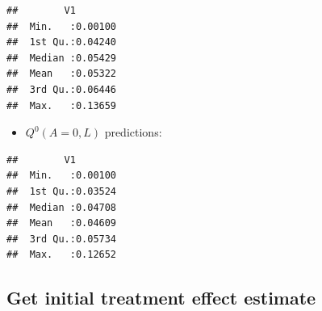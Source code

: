 \documentclass[
]{book}
\newenvironment{Shaded}{\begin{snugshade}}{\end{snugshade}}
\newcommand{\AttributeTok}[1]{\textcolor[rgb]{0.77,0.63,0.00}{#1}}
\newcommand{\DecValTok}[1]{\textcolor[rgb]{0.00,0.00,0.81}{#1}}
\newcommand{\FunctionTok}[1]{\textcolor[rgb]{0.00,0.00,0.00}{#1}}
\newcommand{\NormalTok}[1]{#1}
\newcommand{\OtherTok}[1]{\textcolor[rgb]{0.56,0.35,0.01}{#1}}
\newcommand{\SpecialCharTok}[1]{\textcolor[rgb]{0.00,0.00,0.00}{#1}}
\newcommand{\StringTok}[1]{\textcolor[rgb]{0.31,0.60,0.02}{#1}}
\providecommand{\tightlist}{%
  \setlength{\itemsep}{0pt}\setlength{\parskip}{0pt}}
\begin{document}
\begin{Shaded}
\end{Shaded}

\begin{verbatim}
##        V1         
##  Min.   :0.00100  
##  1st Qu.:0.04240  
##  Median :0.05429  
##  Mean   :0.05322  
##  3rd Qu.:0.06446  
##  Max.   :0.13659
\end{verbatim}

\begin{itemize}
\tightlist
\item
  \(Q^0(A=0,L)\) predictions:
\end{itemize}

\begin{Shaded}
\end{Shaded}

\begin{verbatim}
##        V1         
##  Min.   :0.00100  
##  1st Qu.:0.03524  
##  Median :0.04708  
##  Mean   :0.04609  
##  3rd Qu.:0.05734  
##  Max.   :0.12652
\end{verbatim}

\hypertarget{get-initial-treatment-effect-estimate}{%
\subsection{Get initial treatment effect estimate}\label{get-initial-treatment-effect-estimate}}
\end{document}
